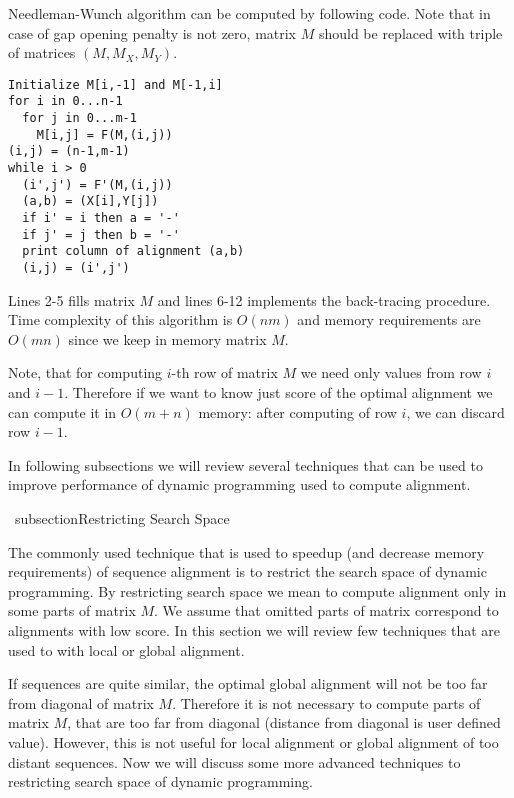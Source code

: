 Needleman-Wunch algorithm can be computed by following code. Note that in case
of gap opening penalty is not zero, matrix $M$ should be replaced with triple of
matrices $(M,M_X,M_Y)$. 

\lstset{showstringspaces=false}
\begin{lstlisting}
Initialize M[i,-1] and M[-1,i]
for i in 0...n-1
  for j in 0...m-1
    M[i,j] = F(M,(i,j))
(i,j) = (n-1,m-1)
while i > 0
  (i',j') = F'(M,(i,j))
  (a,b) = (X[i],Y[j])
  if i' = i then a = '-'
  if j' = j then b = '-'
  print column of alignment (a,b)
  (i,j) = (i',j')
\end{lstlisting}

Lines 2-5 fills matrix $M$ and lines 6-12 implements the back-tracing procedure.
Time complexity of this algorithm is $O(nm)$ and memory requirements are $O(mn)$
since we keep in memory matrix $M$.

Note, that for computing $i$-th row of matrix $M$ we need only values from row
$i$ and $i-1$. Therefore if we want to know just score of the optimal alignment
we can compute it in $O(m+n)$ memory: after computing of row $i$, we can discard
row $i-1$.

In following subsections we will review several techniques that can be used to
improve performance of dynamic programming used to compute alignment.

\ subsection{Restricting Search Space}

The commonly used technique that is used to speedup (and decrease memory
requirements) of sequence alignment is to restrict the search space of dynamic
programming. By restricting search space we mean to compute alignment only in
some parts of matrix $M$. We assume that omitted parts of matrix correspond to
alignments with low score. In this section we will review few techniques that are
used to with local or global alignment.

If sequences are quite similar, the optimal global alignment will not be too far
from diagonal of matrix $M$. Therefore it is not necessary to compute parts of
matrix $M$, that are too far from diagonal (distance from diagonal is user
defined value). However, this is not useful for local alignment or global
alignment of too distant sequences. Now we will discuss some more advanced
techniques to restricting search space of dynamic programming.

